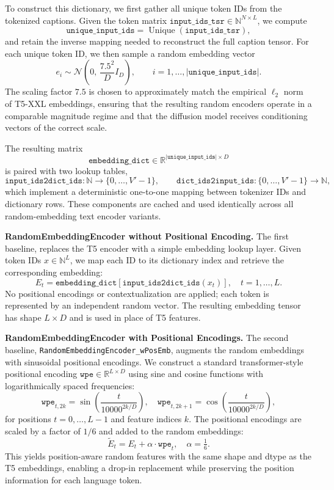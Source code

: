 \documentclass[10pt,twocolumn,letterpaper]{article}
\begin{document}
To construct this dictionary, we first gather all unique token IDs from the tokenized captions. Given the token matrix $\texttt{input\_ids\_tsr} \in \mathbb{N}^{N \times L}$, we compute
\[
\texttt{unique\_input\_ids} = \operatorname{Unique}(\texttt{input\_ids\_tsr}),
\]
and retain the inverse mapping needed to reconstruct the full caption tensor. For each unique token ID, we then sample a random embedding vector
\[
e_i \sim \mathcal{N}\!\left(0,\, \frac{7.5^2}{D} I_D\right), \qquad i = 1,\ldots,|\texttt{unique\_input\_ids}|.
\]
The scaling factor $7.5$ is chosen to approximately match the empirical $\ell_2$ norm of T5-XXL embeddings, ensuring that the resulting random encoders operate in a comparable magnitude regime and that the diffusion model receives conditioning vectors of the correct scale.

The resulting matrix
\[
\texttt{embedding\_dict} \in \mathbb{R}^{|\texttt{unique\_input\_ids}| \times D}
\]
is paired with two lookup tables,
\[
\texttt{input\_ids2dict\_ids} : \mathbb{N} \rightarrow \{0,\ldots,V'-1\}, \qquad
\texttt{dict\_ids2input\_ids} : \{0,\ldots,V'-1\} \rightarrow \mathbb{N},
\]
which implement a deterministic one-to-one mapping between tokenizer IDs and dictionary rows. These components are cached and used identically across all random-embedding text encoder variants. %


\textbf{RandomEmbeddingEncoder without Positional Encoding.}
The first baseline, replaces the T5 encoder with a simple embedding lookup layer. Given token IDs $x \in \mathbb{N}^{L}$, we map each ID to its dictionary index and retrieve the corresponding embedding:
\[
E_{t} = \texttt{embedding\_dict}[\texttt{input\_ids2dict\_ids}(x_t)], \quad t=1,\ldots,L.
\]
No positional encodings or contextualization are applied; each token is represented by an independent random vector. The resulting embedding tensor has shape $L \times D$ and is used in place of T5 features.

\textbf{RandomEmbeddingEncoder with Positional Encodings.}
The second baseline, \texttt{RandomEmbeddingEncoder\_wPosEmb}, augments the random embeddings with sinusoidal positional encodings. We construct a standard transformer-style positional encoding
$\texttt{wpe} \in \mathbb{R}^{L \times D}$
using sine and cosine functions with logarithmically spaced frequencies:
\[
\texttt{wpe}_{t,2k} = \sin\left(\frac{t}{10000^{2k/D}}\right), \quad
\texttt{wpe}_{t,2k+1} = \cos\left(\frac{t}{10000^{2k/D}}\right),
\]
for positions $t=0,\ldots,L-1$ and feature indices $k$. The positional encodings are scaled by a factor of $1/6$ and added to the random embeddings:
\[
\tilde{E}_t = E_t + \alpha \cdot \texttt{wpe}_t,\quad \alpha = \tfrac{1}{6}.
\]
This yields position-aware random features with the same shape and dtype as the T5 embeddings, enabling a drop-in replacement while preserving the position information for each language token.
\end{document}
